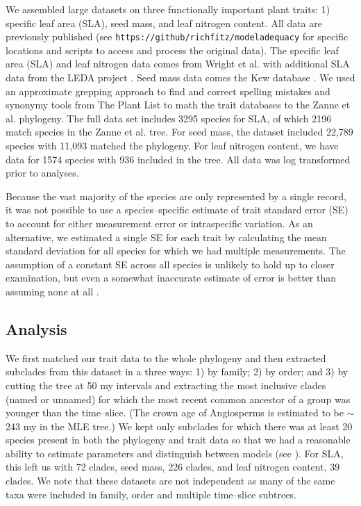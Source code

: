 \documentclass[a4paper,12pt]{article}
\begin{document}
We assembled large datasets on three functionally important plant traits: 1) specific leaf area (SLA), seed mass, and leaf nitrogen content. All data are previously published (see \texttt{https://github/richfitz/modeladequacy} for specific locations and scripts to access and process the original data). The specific leaf area (SLA) and leaf nitrogen data comes from Wright et al. \citep{Wright2004} with additional SLA data from the LEDA project \citep{Kleyer2008}. Seed mass data comes the Kew database \citep{Kew2008}. We used an approximate grepping approach to find and correct spelling mistakes and synonymy tools from The Plant List \citep{plantlist} to math the trait databases to the Zanne et al. phylogeny. 
The full data set includes 3295 species for SLA, of which 2196 match species in the Zanne et al. tree. For seed mass, the dataset included 22,789 species with 11,093 matched the phylogeny. For leaf nitrogen content, we have data for 1574 species with 936 included in the tree. All data was log transformed prior to analyses.

Because the vast majority of the species are only represented by a single
record, it was not possible to use a species--specific estimate of
trait standard error (SE) to account for either measurement error or
intraspecific variation.  As an alternative, we estimated a single SE for each trait
by calculating the mean
standard deviation for all species for which we had multiple
measurements. The assumption of a constant SE across all species is
unlikely to hold up to closer examination, but even a somewhat
inaccurate estimate of error is better than assuming none at all
\citep{Hansen2012}.

\subsection{Analysis}

We first matched our trait data to the whole phylogeny and then extracted subclades from this dataset in a three ways: 1) by family; 2) by order; and 3) by cutting the tree at 50 my intervals and extracting the most inclusive clades (named or unnamed) for which the most recent common ancestor of a group was younger than the time--slice. 
(The crown age of Angiosperms is estimated to be $\sim$243 my in the MLE tree.) We kept only subclades for which there was at least 20 species present in both the phylogeny and trait data so that we had a reasonable ability to estimate parameters and distinguish between models (see \citep{Boettiger2012, SlaterPennell}). 
For SLA, this left us with 72 clades, seed mass, 226 clades, and leaf nitrogen content, 39 clades. We note that these datasets are not independent as many of the same taxa were included in family, order and multiple time--slice subtrees. 
\end{document}
